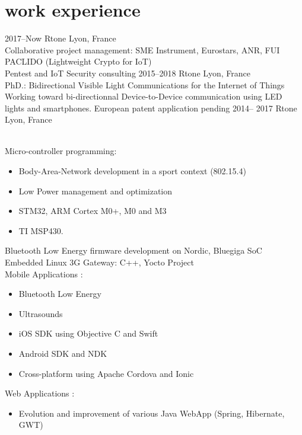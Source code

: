 \documentclass[]{cv-style}          %
\begin{document}
\section{work experience}

\begin{entrylist}
\entry
{2017--Now}
{Rtone}
{Lyon, France}
{\\
Collaborative project management: SME Instrument, Eurostars, ANR, FUI PACLIDO (Lightweight Crypto for IoT)\\
Pentest and IoT Security consulting}
\entry
  {2015--2018}
  {Rtone}
  {Lyon, France}
  {\\
  PhD.: Bidirectional Visible Light Communications for
 the Internet of Things\\
  Working toward bi-directionnal Device-to-Device communication using LED lights and smartphones. European patent application pending}
\entry
  {2014-- 2017}
  {Rtone}
  {Lyon, France}
  {\\
  Micro-controller programming:
  \begin{itemize}
    \item Body-Area-Network development in a sport context (802.15.4)
    \item Low Power management and optimization
    \item STM32, ARM Cortex M0+, M0 and M3
    \item TI MSP430.
  \end{itemize}
  Bluetooth Low Energy firmware development on Nordic, Bluegiga SoC\\
  Embedded Linux 3G Gateway: C++, Yocto Project\\
  Mobile Applications :
  \begin{itemize}
    \item Bluetooth Low Energy
    \item Ultrasounds
    \item iOS SDK using Objective C and Swift
    \item Android SDK and NDK
    \item Cross-platform using Apache Cordova and Ionic
  \end{itemize}
  Web Applications :
  \begin{itemize}
    \item Evolution and improvement of various Java WebApp (Spring, Hibernate, GWT)

\end{itemize}}
\end{entrylist}
\end{document}
